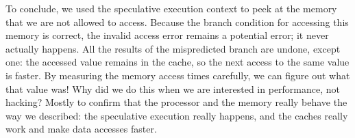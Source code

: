 To conclude, we used the speculative execution context to peek at the memory that we are not allowed to access. Because the branch condition for accessing this memory is correct, the invalid access error remains a potential error; it never actually happens. All the results of the mispredicted branch are undone, except one: the accessed value remains in the cache, so the next access to the same value is faster. By measuring the memory access times carefully, we can figure out what that value was! Why did we do this when we are interested in performance, not hacking? Mostly to confirm that the processor and the memory really behave the way we described: the speculative execution really happens, and the caches really work and make data accesses faster.



















